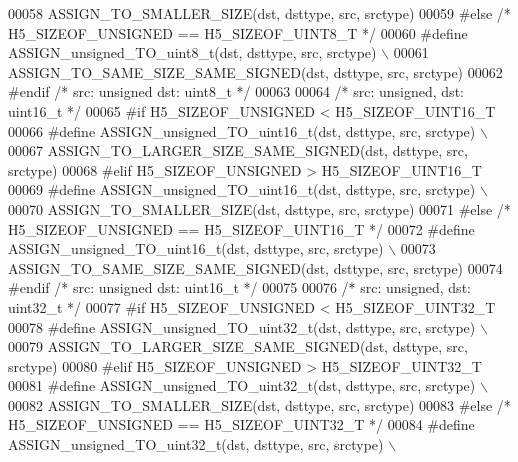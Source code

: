 \begin{DoxyCode}
00058 \textcolor{preprocessor}{        ASSIGN\_TO\_SMALLER\_SIZE(dst, dsttype, src, srctype)}
00059 \textcolor{preprocessor}{#else }\textcolor{comment}{/* H5\_SIZEOF\_UNSIGNED == H5\_SIZEOF\_UINT8\_T */}\textcolor{preprocessor}{}
00060 \textcolor{preprocessor}{    #define ASSIGN\_unsigned\_TO\_uint8\_t(dst, dsttype, src, srctype) \(\backslash\)}
00061 \textcolor{preprocessor}{        ASSIGN\_TO\_SAME\_SIZE\_SAME\_SIGNED(dst, dsttype, src, srctype)}
00062 \textcolor{preprocessor}{#endif }\textcolor{comment}{/* src: unsigned dst: uint8\_t */}\textcolor{preprocessor}{}
00063 
00064 \textcolor{comment}{/* src: unsigned, dst: uint16\_t */}
00065 \textcolor{preprocessor}{#if H5\_SIZEOF\_UNSIGNED < H5\_SIZEOF\_UINT16\_T}
00066 \textcolor{preprocessor}{    #define ASSIGN\_unsigned\_TO\_uint16\_t(dst, dsttype, src, srctype) \(\backslash\)}
00067 \textcolor{preprocessor}{        ASSIGN\_TO\_LARGER\_SIZE\_SAME\_SIGNED(dst, dsttype, src, srctype)}
00068 \textcolor{preprocessor}{#elif H5\_SIZEOF\_UNSIGNED > H5\_SIZEOF\_UINT16\_T}
00069 \textcolor{preprocessor}{    #define ASSIGN\_unsigned\_TO\_uint16\_t(dst, dsttype, src, srctype) \(\backslash\)}
00070 \textcolor{preprocessor}{        ASSIGN\_TO\_SMALLER\_SIZE(dst, dsttype, src, srctype)}
00071 \textcolor{preprocessor}{#else }\textcolor{comment}{/* H5\_SIZEOF\_UNSIGNED == H5\_SIZEOF\_UINT16\_T */}\textcolor{preprocessor}{}
00072 \textcolor{preprocessor}{    #define ASSIGN\_unsigned\_TO\_uint16\_t(dst, dsttype, src, srctype) \(\backslash\)}
00073 \textcolor{preprocessor}{        ASSIGN\_TO\_SAME\_SIZE\_SAME\_SIGNED(dst, dsttype, src, srctype)}
00074 \textcolor{preprocessor}{#endif }\textcolor{comment}{/* src: unsigned dst: uint16\_t */}\textcolor{preprocessor}{}
00075 
00076 \textcolor{comment}{/* src: unsigned, dst: uint32\_t */}
00077 \textcolor{preprocessor}{#if H5\_SIZEOF\_UNSIGNED < H5\_SIZEOF\_UINT32\_T}
00078 \textcolor{preprocessor}{    #define ASSIGN\_unsigned\_TO\_uint32\_t(dst, dsttype, src, srctype) \(\backslash\)}
00079 \textcolor{preprocessor}{        ASSIGN\_TO\_LARGER\_SIZE\_SAME\_SIGNED(dst, dsttype, src, srctype)}
00080 \textcolor{preprocessor}{#elif H5\_SIZEOF\_UNSIGNED > H5\_SIZEOF\_UINT32\_T}
00081 \textcolor{preprocessor}{    #define ASSIGN\_unsigned\_TO\_uint32\_t(dst, dsttype, src, srctype) \(\backslash\)}
00082 \textcolor{preprocessor}{        ASSIGN\_TO\_SMALLER\_SIZE(dst, dsttype, src, srctype)}
00083 \textcolor{preprocessor}{#else }\textcolor{comment}{/* H5\_SIZEOF\_UNSIGNED == H5\_SIZEOF\_UINT32\_T */}\textcolor{preprocessor}{}
00084 \textcolor{preprocessor}{    #define ASSIGN\_unsigned\_TO\_uint32\_t(dst, dsttype, src, srctype) \(\backslash\)}

\end{DoxyCode}
